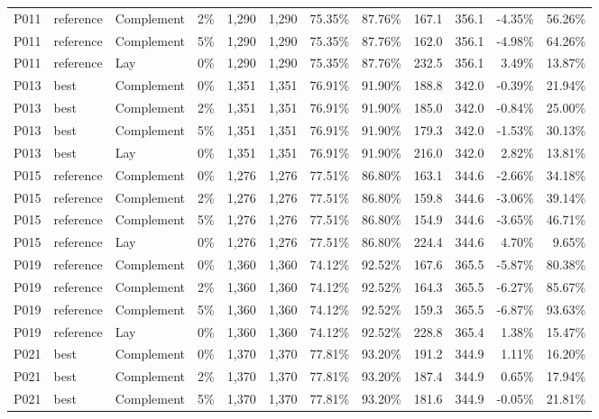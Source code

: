 \begin{longtable}{llllrrrrrrrr}
P011 & reference & Complement & 2\% & 1,290 & 1,290 & 75.35\% & 87.76\% & 167.1 & 356.1 & -4.35\% & 56.26\% \\
P011 & reference & Complement & 5\% & 1,290 & 1,290 & 75.35\% & 87.76\% & 162.0 & 356.1 & -4.98\% & 64.26\% \\
P011 & reference & Lay & 0\% & 1,290 & 1,290 & 75.35\% & 87.76\% & 232.5 & 356.1 & 3.49\% & 13.87\% \\
P013 & best & Complement & 0\% & 1,351 & 1,351 & 76.91\% & 91.90\% & 188.8 & 342.0 & -0.39\% & 21.94\% \\
P013 & best & Complement & 2\% & 1,351 & 1,351 & 76.91\% & 91.90\% & 185.0 & 342.0 & -0.84\% & 25.00\% \\
P013 & best & Complement & 5\% & 1,351 & 1,351 & 76.91\% & 91.90\% & 179.3 & 342.0 & -1.53\% & 30.13\% \\
P013 & best & Lay & 0\% & 1,351 & 1,351 & 76.91\% & 91.90\% & 216.0 & 342.0 & 2.82\% & 13.81\% \\
P015 & reference & Complement & 0\% & 1,276 & 1,276 & 77.51\% & 86.80\% & 163.1 & 344.6 & -2.66\% & 34.18\% \\
P015 & reference & Complement & 2\% & 1,276 & 1,276 & 77.51\% & 86.80\% & 159.8 & 344.6 & -3.06\% & 39.14\% \\
P015 & reference & Complement & 5\% & 1,276 & 1,276 & 77.51\% & 86.80\% & 154.9 & 344.6 & -3.65\% & 46.71\% \\
P015 & reference & Lay & 0\% & 1,276 & 1,276 & 77.51\% & 86.80\% & 224.4 & 344.6 & 4.70\% & 9.65\% \\
P019 & reference & Complement & 0\% & 1,360 & 1,360 & 74.12\% & 92.52\% & 167.6 & 365.5 & -5.87\% & 80.38\% \\
P019 & reference & Complement & 2\% & 1,360 & 1,360 & 74.12\% & 92.52\% & 164.3 & 365.5 & -6.27\% & 85.67\% \\
P019 & reference & Complement & 5\% & 1,360 & 1,360 & 74.12\% & 92.52\% & 159.3 & 365.5 & -6.87\% & 93.63\% \\
P019 & reference & Lay & 0\% & 1,360 & 1,360 & 74.12\% & 92.52\% & 228.8 & 365.4 & 1.38\% & 15.47\% \\
P021 & best & Complement & 0\% & 1,370 & 1,370 & 77.81\% & 93.20\% & 191.2 & 344.9 & 1.11\% & 16.20\% \\
P021 & best & Complement & 2\% & 1,370 & 1,370 & 77.81\% & 93.20\% & 187.4 & 344.9 & 0.65\% & 17.94\% \\
P021 & best & Complement & 5\% & 1,370 & 1,370 & 77.81\% & 93.20\% & 181.6 & 344.9 & -0.05\% & 21.81\% \\

\end{longtable}
